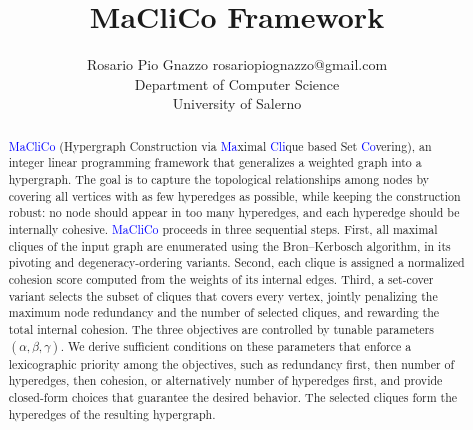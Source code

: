 \documentclass[10pt]{article} %
\title{MaCliCo Framework}
\author{\name Rosario Pio Gnazzo \email rosariopiognazzo@gmail.com \\
      \addr Department of Computer Science\\
      University of Salerno}
\begin{document}
\maketitle

\begin{abstract}
\textcolor{blue}{MaCliCo} (Hypergraph Construction via \textcolor{blue}{Ma}ximal \textcolor{blue}{Cli}que based Set \textcolor{blue}{Co}vering), an integer linear programming framework that generalizes a weighted graph into a hypergraph. The goal is to capture the topological relationships among nodes by covering all vertices with as few hyperedges as possible, while keeping the construction robust: no node should appear in too many hyperedges, and each hyperedge should be internally cohesive. \textcolor{blue}{MaCliCo} proceeds in three sequential steps. First, all maximal cliques of the input graph are enumerated using the Bron--Kerbosch algorithm, in its pivoting and degeneracy-ordering variants. Second, each clique is assigned a normalized cohesion score computed from the weights of its internal edges. Third, a set-cover variant selects the subset of cliques that covers every vertex, jointly penalizing the maximum node redundancy and the number of selected cliques, and rewarding the total internal cohesion. The three objectives are controlled by tunable parameters $(\alpha, \beta, \gamma)$. We derive sufficient conditions on these parameters that enforce a lexicographic priority among the objectives, such as redundancy first, then number of hyperedges, then cohesion, or alternatively number of hyperedges first, and provide closed-form choices that guarantee the desired behavior. The selected cliques form the hyperedges of the resulting hypergraph.
\end{abstract}
\end{document}
